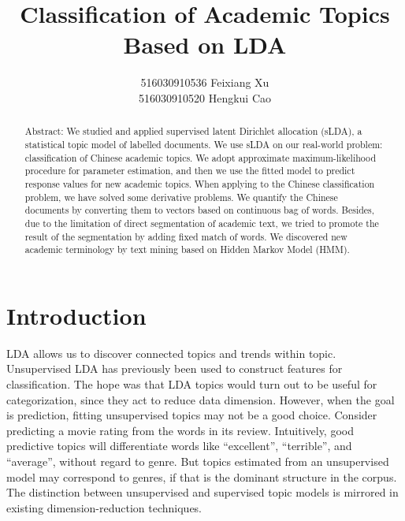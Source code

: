 \documentclass{acmtog} %
\begin{document}

\title{Classification of Academic Topics\\ Based on LDA} %

\author{516030910536 Feixiang Xu \\ 516030910520 Hengkui Cao
}


\maketitle

\begin{abstract}
Abstract: We studied and applied supervised latent Dirichlet allocation (sLDA), a statistical topic model of labelled documents. We use sLDA on our real-world problem: classification of Chinese academic topics. We adopt approximate maximum-likelihood procedure for parameter estimation, and then we use the fitted model to predict response values for new academic topics. 
When applying to the Chinese classification problem, we have solved some derivative problems. We quantify the Chinese documents by converting them to vectors based on continuous bag of words. Besides, due to the limitation of direct segmentation of academic text, we tried to promote the result of the segmentation by adding fixed match of words. We discovered new academic terminology by text mining based on Hidden Markov Model (HMM).
\end{abstract}

\section{Introduction}
LDA allows us to discover connected topics and trends within topic. Unsupervised LDA has previously been used to construct features for classification. The hope was that LDA topics would turn out to be useful for categorization, since they act to reduce data dimension. However, when the goal is prediction, fitting unsupervised topics may not be a good choice. Consider predicting a movie rating from the words in its review. Intuitively, good predictive topics will differentiate words like “excellent”, “terrible”, and “average”, without regard to genre. But topics estimated from an unsupervised model may correspond to genres, if that is the dominant structure in the corpus. The distinction between unsupervised and supervised topic models is mirrored in existing dimension-reduction techniques.
\end{document}
